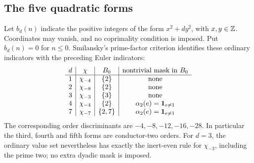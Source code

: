 \subsection{The five quadratic forms}

Let \(b_d(n)\) indicate the positive integers of the form
\(x^2+dy^2\), with \(x,y\in\mathbb Z\). Coordinates may vanish,
and no coprimality condition is imposed. Put \(b_d(n)=0\)
for \(n\le0\). Smilansky's
prime-factor criterion \cite[Theorem 10]{smilansky} identifies
these ordinary indicators with the preceding Euler indicators:
\[
\begin{array}{c|c|c|c}
d&\chi&B_0&\text{nontrivial mask in }B_0\\\hline
1&\chi_{-4}&\{2\}&\text{none}\\
2&\chi_{-8}&\{2\}&\text{none}\\
3&\chi_{-3}&\{3\}&\text{none}\\
4&\chi_{-4}&\{2\}&\alpha_2(e)=\mathbf 1_{e\ne1}\\
7&\chi_{-7}&\{2,7\}&\alpha_2(e)=\mathbf 1_{e\ne1}
\end{array}
\]
The corresponding order discriminants are \(-4,-8,-12,-16,-28\).
In particular the third, fourth and fifth forms are conductor-two
orders. For \(d=3\), the ordinary value set nevertheless has
exactly the inert-even rule for \(\chi_{-3}\), including the
prime two; no extra dyadic mask is imposed.



